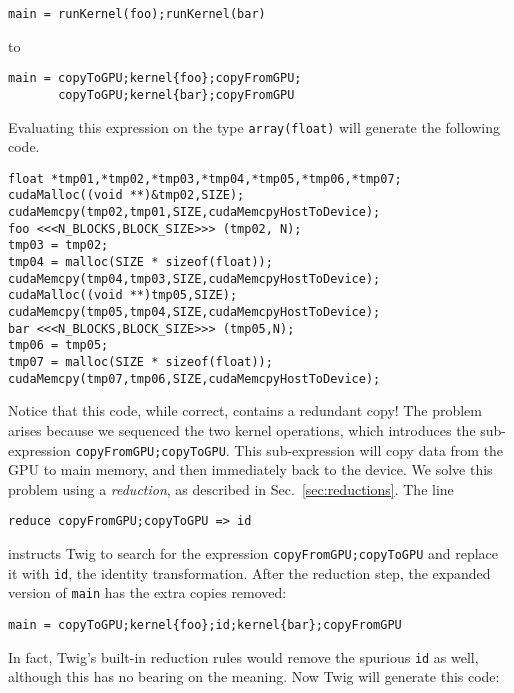 \begin{verbatim}
main = runKernel(foo);runKernel(bar)
\end{verbatim}

\noindent to 

\begin{verbatim}
main = copyToGPU;kernel{foo};copyFromGPU;
       copyToGPU;kernel{bar};copyFromGPU
\end{verbatim}

Evaluating this expression on the type \texttt{array(float)} will
generate the following code.

\begin{verbatim}
float *tmp01,*tmp02,*tmp03,*tmp04,*tmp05,*tmp06,*tmp07;
cudaMalloc((void **)&tmp02,SIZE);
cudaMemcpy(tmp02,tmp01,SIZE,cudaMemcpyHostToDevice);
foo <<<N_BLOCKS,BLOCK_SIZE>>> (tmp02, N);
tmp03 = tmp02;
tmp04 = malloc(SIZE * sizeof(float));
cudaMemcpy(tmp04,tmp03,SIZE,cudaMemcpyHostToDevice);
cudaMalloc((void **)tmp05,SIZE);
cudaMemcpy(tmp05,tmp04,SIZE,cudaMemcpyHostToDevice);
bar <<<N_BLOCKS,BLOCK_SIZE>>> (tmp05,N);
tmp06 = tmp05;
tmp07 = malloc(SIZE * sizeof(float));
cudaMemcpy(tmp07,tmp06,SIZE,cudaMemcpyHostToDevice);
\end{verbatim}

Notice that this code, while correct, contains a redundant copy! The problem arises because we sequenced the two kernel operations, which introduces the sub-expression \texttt{copyFromGPU;copyToGPU}. This sub-expression will copy data from the GPU to main memory, and then immediately back to the device. We solve this problem using a \emph{reduction}, as described in Sec.~\ref{sec:reductions}. The line

\begin{verbatim}
reduce copyFromGPU;copyToGPU => id
\end{verbatim}

\noindent instructs Twig to search for the expression \texttt{copyFromGPU;copyToGPU} and replace it with \texttt{id}, the identity transformation. After the reduction step, the expanded version of \texttt{main} has the extra copies removed:

\begin{verbatim}
main = copyToGPU;kernel{foo};id;kernel{bar};copyFromGPU
\end{verbatim}

In fact, Twig's built-in reduction rules would remove the spurious \texttt{id} as well, although this has no bearing on the meaning. Now Twig will generate this code:

